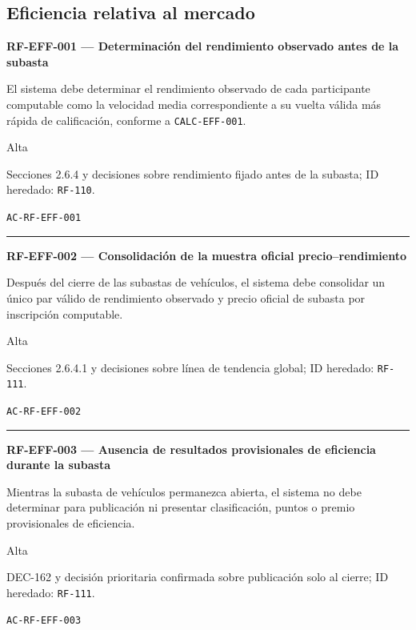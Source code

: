 \documentclass[10pt,letterpaper]{article}
\begin{document}
\subsection{Eficiencia relativa al mercado}
\noindent\textbf{RF-EFF-001 --- Determinación del rendimiento observado antes de la subasta}\par
\begin{description}[style=nextline,leftmargin=3.15cm,labelwidth=2.8cm,font=\normalfont\bfseries]
\item[Obligación] El sistema debe determinar el rendimiento observado de cada participante computable como la velocidad media correspondiente a su vuelta válida más rápida de calificación, conforme a \texttt{CALC-EFF-001}.
\item[Prioridad] Alta
\item[Procedencia] Secciones 2.6.4 y decisiones sobre rendimiento fijado antes de la subasta; ID heredado: \texttt{RF-110}.
\item[Verificación] \texttt{AC-RF-EFF-001}
\end{description}
\vspace{0.25em}\hrule\vspace{0.65em}
\noindent\textbf{RF-EFF-002 --- Consolidación de la muestra oficial precio--rendimiento}\par
\begin{description}[style=nextline,leftmargin=3.15cm,labelwidth=2.8cm,font=\normalfont\bfseries]
\item[Obligación] Después del cierre de las subastas de vehículos, el sistema debe consolidar un único par válido de rendimiento observado y precio oficial de subasta por inscripción computable.
\item[Prioridad] Alta
\item[Procedencia] Secciones 2.6.4.1 y decisiones sobre línea de tendencia global; ID heredado: \texttt{RF-111}.
\item[Verificación] \texttt{AC-RF-EFF-002}
\end{description}
\vspace{0.25em}\hrule\vspace{0.65em}
\noindent\textbf{RF-EFF-003 --- Ausencia de resultados provisionales de eficiencia durante la subasta}\par
\begin{description}[style=nextline,leftmargin=3.15cm,labelwidth=2.8cm,font=\normalfont\bfseries]
\item[Obligación] Mientras la subasta de vehículos permanezca abierta, el sistema no debe determinar para publicación ni presentar clasificación, puntos o premio provisionales de eficiencia.
\item[Prioridad] Alta
\item[Procedencia] DEC-162 y decisión prioritaria confirmada sobre publicación solo al cierre; ID heredado: \texttt{RF-111}.
\item[Verificación] \texttt{AC-RF-EFF-003}
\end{description}
\end{document}
